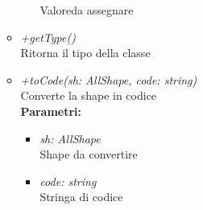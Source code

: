 \begin{itemize}
\begin{itemize}
\begin{itemize}
    			Valoreda assegnare
    		\end{itemize}
    		\item \emph{+getType()}\\
    		Ritorna il tipo della classe
    		\item \emph{+toCode(sh: AllShape, code: string)}\\
    		Converte la shape in codice\\
    		\textbf{Parametri:}
    		\begin{itemize}
    			\item \emph{sh: AllShape}\\
    			Shape da convertire
    			\item \emph{code: string}\\
    			Stringa di codice
    		\end{itemize}
    	\end{itemize}
\end{itemize}